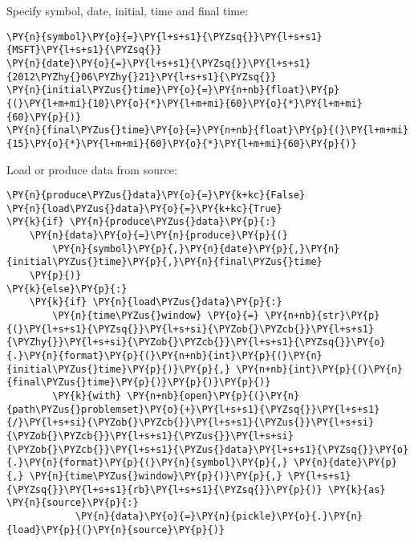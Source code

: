 \documentclass[9pt]{article}
\begin{document}
    Specify symbol, date, initial, time and final time:

    \begin{tcolorbox}[breakable, size=fbox, boxrule=1pt, pad at break*=1mm,colback=cellbackground, colframe=cellborder]
\begin{Verbatim}[commandchars=\\\{\}]
\PY{n}{symbol}\PY{o}{=}\PY{l+s+s1}{\PYZsq{}}\PY{l+s+s1}{MSFT}\PY{l+s+s1}{\PYZsq{}}
\PY{n}{date}\PY{o}{=}\PY{l+s+s1}{\PYZsq{}}\PY{l+s+s1}{2012\PYZhy{}06\PYZhy{}21}\PY{l+s+s1}{\PYZsq{}}
\PY{n}{initial\PYZus{}time}\PY{o}{=}\PY{n+nb}{float}\PY{p}{(}\PY{l+m+mi}{10}\PY{o}{*}\PY{l+m+mi}{60}\PY{o}{*}\PY{l+m+mi}{60}\PY{p}{)}
\PY{n}{final\PYZus{}time}\PY{o}{=}\PY{n+nb}{float}\PY{p}{(}\PY{l+m+mi}{15}\PY{o}{*}\PY{l+m+mi}{60}\PY{o}{*}\PY{l+m+mi}{60}\PY{p}{)}
\end{Verbatim}
\end{tcolorbox}

    Load or produce data from source:

    \begin{tcolorbox}[breakable, size=fbox, boxrule=1pt, pad at break*=1mm,colback=cellbackground, colframe=cellborder]
\begin{Verbatim}[commandchars=\\\{\}]
\PY{n}{produce\PYZus{}data}\PY{o}{=}\PY{k+kc}{False}
\PY{n}{load\PYZus{}data}\PY{o}{=}\PY{k+kc}{True}
\PY{k}{if} \PY{n}{produce\PYZus{}data}\PY{p}{:}
    \PY{n}{data}\PY{o}{=}\PY{n}{produce}\PY{p}{(}
        \PY{n}{symbol}\PY{p}{,}\PY{n}{date}\PY{p}{,}\PY{n}{initial\PYZus{}time}\PY{p}{,}\PY{n}{final\PYZus{}time}
    \PY{p}{)}
\PY{k}{else}\PY{p}{:}
    \PY{k}{if} \PY{n}{load\PYZus{}data}\PY{p}{:}
        \PY{n}{time\PYZus{}window} \PY{o}{=} \PY{n+nb}{str}\PY{p}{(}\PY{l+s+s1}{\PYZsq{}}\PY{l+s+si}{\PYZob{}\PYZcb{}}\PY{l+s+s1}{\PYZhy{}}\PY{l+s+si}{\PYZob{}\PYZcb{}}\PY{l+s+s1}{\PYZsq{}}\PY{o}{.}\PY{n}{format}\PY{p}{(}\PY{n+nb}{int}\PY{p}{(}\PY{n}{initial\PYZus{}time}\PY{p}{)}\PY{p}{,} \PY{n+nb}{int}\PY{p}{(}\PY{n}{final\PYZus{}time}\PY{p}{)}\PY{p}{)}\PY{p}{)}
        \PY{k}{with} \PY{n+nb}{open}\PY{p}{(}\PY{n}{path\PYZus{}problemset}\PY{o}{+}\PY{l+s+s1}{\PYZsq{}}\PY{l+s+s1}{/}\PY{l+s+si}{\PYZob{}\PYZcb{}}\PY{l+s+s1}{\PYZus{}}\PY{l+s+si}{\PYZob{}\PYZcb{}}\PY{l+s+s1}{\PYZus{}}\PY{l+s+si}{\PYZob{}\PYZcb{}}\PY{l+s+s1}{\PYZus{}data}\PY{l+s+s1}{\PYZsq{}}\PY{o}{.}\PY{n}{format}\PY{p}{(}\PY{n}{symbol}\PY{p}{,} \PY{n}{date}\PY{p}{,} \PY{n}{time\PYZus{}window}\PY{p}{)}\PY{p}{,} \PY{l+s+s1}{\PYZsq{}}\PY{l+s+s1}{rb}\PY{l+s+s1}{\PYZsq{}}\PY{p}{)} \PY{k}{as} \PY{n}{source}\PY{p}{:}
            \PY{n}{data}\PY{o}{=}\PY{n}{pickle}\PY{o}{.}\PY{n}{load}\PY{p}{(}\PY{n}{source}\PY{p}{)}
\end{Verbatim}
\end{tcolorbox}
\end{document}
